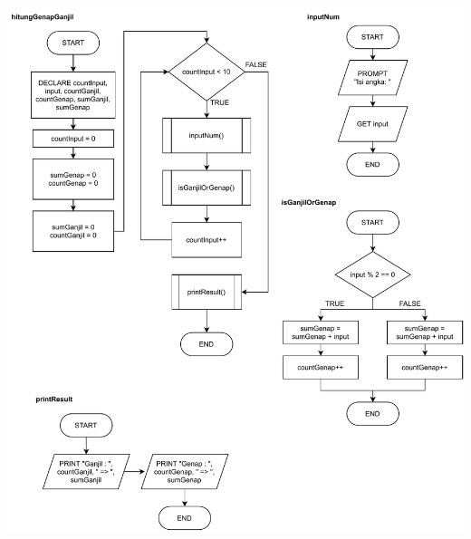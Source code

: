 \documentclass[
  11pt,
  answers  
]{exam}
\begin{document}
  \begin{questions}
    \question 

    \begin{solution}
      \begin{center}
        \includegraphics[clip, scale=0.8]{pdf/nomor1.pdf}
      \end{center}
    \end{solution}

    \pagebreak


\end{questions}
\end{document}
